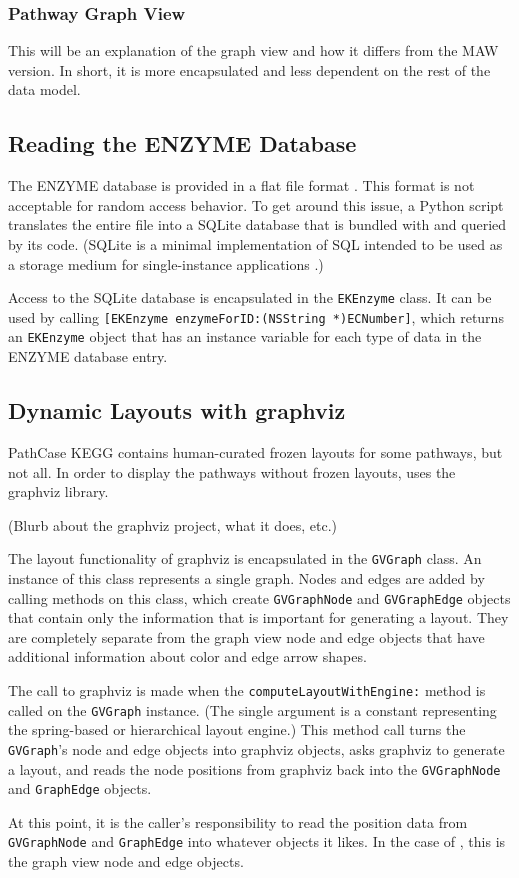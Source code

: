 \subsubsection{Pathway Graph View}
\label{sect:kegg_impl_graph_view}

This will be an explanation of the \keggapp graph view and how it differs from
the MAW version. In short, it is more encapsulated and less dependent on the
rest of the data model.

\subsection{Reading the ENZYME Database}
\label{sect:kegg_impl_enzyme}

The ENZYME database is provided in a flat file format \cite{enzyme:enzuser}. This
format is not acceptable for random access behavior. To get around this issue, a
Python script translates the entire file into a SQLite database that is bundled
with \keggapp and queried by its code. (SQLite is a minimal implementation
of SQL intended to be used as a storage medium for single-instance applications
\cite{sqlite:main}.)

Access to the SQLite database is encapsulated in the \texttt{EKEnzyme} class. It
can be used by calling \texttt{[EKEnzyme enzymeForID:(NSString *)ECNumber]},
which returns an \texttt{EKEnzyme} object that has an instance variable for each
type of data in the ENZYME database entry.

\subsection{Dynamic Layouts with graphviz}
\label{sect:kegg_impl_graphviz}

PathCase KEGG contains human-curated frozen layouts for some pathways, but not
all. In order to display the pathways without frozen layouts, \keggapp
uses the graphviz library.

(Blurb about the graphviz project, what it does, etc.)

The layout functionality of graphviz is encapsulated in the \texttt{GVGraph}
class. An instance of this class represents a single graph. Nodes and edges are
added by calling methods on this class, which create \texttt{GVGraphNode} and
\texttt{GVGraphEdge} objects that contain only the information that is important
for generating a layout. They are completely separate from the graph view node
and edge objects that have additional information about color and edge arrow
shapes.

The call to graphviz is made when the \texttt{computeLayoutWithEngine:} method
is called on the \texttt{GVGraph} instance. (The single argument is a constant
representing the spring-based or hierarchical layout engine.) This method call
turns the \texttt{GVGraph}'s node and edge objects into graphviz objects, asks
graphviz to generate a layout, and reads the node positions from graphviz back
into the \texttt{GVGraphNode} and \texttt{GraphEdge} objects.

At this point, it is the caller's responsibility to read the position data from
\texttt{GVGraphNode} and \texttt{GraphEdge} into whatever objects it likes. In
the case of \keggapp, this is the graph view node and edge objects.
